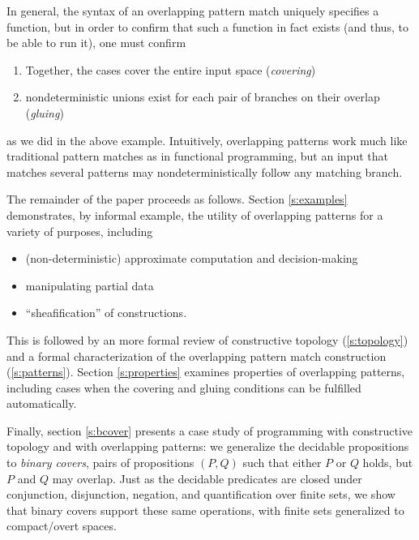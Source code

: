 \documentclass[conference]{IEEEtran}
\newcommand{\R}{\mathbb{R}}
\begin{document}
In general, the syntax of an overlapping pattern match uniquely specifies a function, but in order to confirm that such a function in fact exists (and thus, to be able to run it), one must confirm
\begin{enumerate}
\item Together, the cases cover the entire input space (\emph{covering})
\item nondeterministic unions exist for each pair of branches on their overlap (\emph{gluing})
\end{enumerate}
as we did in the above example. Intuitively, overlapping patterns work much like traditional pattern matches as in functional programming, but an input that matches several patterns may nondeterministically follow any matching branch.


The remainder of the paper proceeds as follows. Section \ref{s:examples} demonstrates, by informal example, the utility of overlapping patterns for a variety of purposes, including
\begin{itemize}
\item (non-deterministic) approximate computation and decision-making
\item manipulating partial data
\item ``sheafification'' of constructions.
\end{itemize}

This is followed by an more formal review of constructive topology (\ref{s:topology}) and a formal characterization of the overlapping pattern match construction (\ref{s:patterns}). Section \ref{s:properties} examines properties of overlapping patterns, including cases when the covering and gluing conditions can be fulfilled automatically. 

Finally, section \ref{s:bcover} presents a case study of programming with constructive topology and with overlapping patterns: we generalize the decidable propositions to \emph{binary covers}, pairs of propositions $(P, Q)$ such that either $P$ or $Q$ holds, but $P$ and $Q$ may overlap. Just as the decidable predicates are closed under conjunction, disjunction, negation, and quantification over finite sets, we show that binary covers support these same operations, with finite sets generalized to compact/overt spaces.
\end{document}
